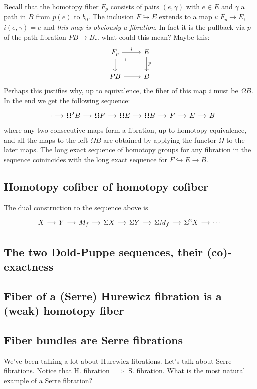 Recall that the homotopy fiber $F_p$ consists of pairs $(e,\gamma)$ with $e\in E$ and $\gamma$ a path in $B$ from $p(e)$ to $b_0$. The inclusion $F\hookrightarrow E$ extends to a map $i:F_{p}\to E$, $i(e,\gamma)=e$ and \textit{this map is obviously a fibration}. In fact it is the pullback via $p$ of the path fibration $PB\to B$… {\color{blue}what could this mean? Maybe this:}
\[\begin{tikzcd}
	F_{p}\arrow[r,"i"]\arrow[d]\arrow[dr,phantom,very near start,"\lrcorner"]&E\arrow[d,"p"]\\
	PB\arrow[r]&B
\end{tikzcd}\]
Perhaps this justifies why, up to equivalence, the fiber of this map $i$ must be $\Omega B$. In the end we get the following sequence:
\[\begin{tikzcd}[column sep=small]
	\cdots\arrow[r]&\Omega^{2}B\arrow[r]&\Omega F\arrow[r]&\Omega E\arrow[r]&\Omega B\arrow[r]&F\arrow[r]&E\arrow[r]&B
\end{tikzcd}\]
where any two consecutive maps form a fibration, up to homotopy equivalence, and all the maps to the left $\Omega B$ are obtained by applying the functor $\Omega$ to the later maps. The long exact sequence of homotopy groups for any fibration in the sequence coinincides with the long exact sequence for $F\hookrightarrow E\to B$.

\subsection{Homotopy cofiber of homotopy cofiber}

The dual construction to the sequence above is
\[\begin{tikzcd}[column sep=small]
	X\arrow[r]&Y\arrow[r]&M_{f}\arrow[r]&\Sigma X\arrow[r]&\Sigma Y\arrow[r]&\Sigma M_{f}\arrow[r]&\Sigma^{2}X\arrow[r]&\cdots 
\end{tikzcd}\]

\subsection{The two Dold-Puppe sequences, their (co)-exactness}

\subsection{Fiber of a (Serre) Hurewicz fibration is a (weak) homotopy fiber}

\subsection{Fiber bundles are Serre fibrations}
We've been talking a lot about Hurewicz fibrations. Let's talk about Serre fibrations. Notice that H. fibration $\implies$ S. fibration. What is the most natural example of a Serre fibration?

